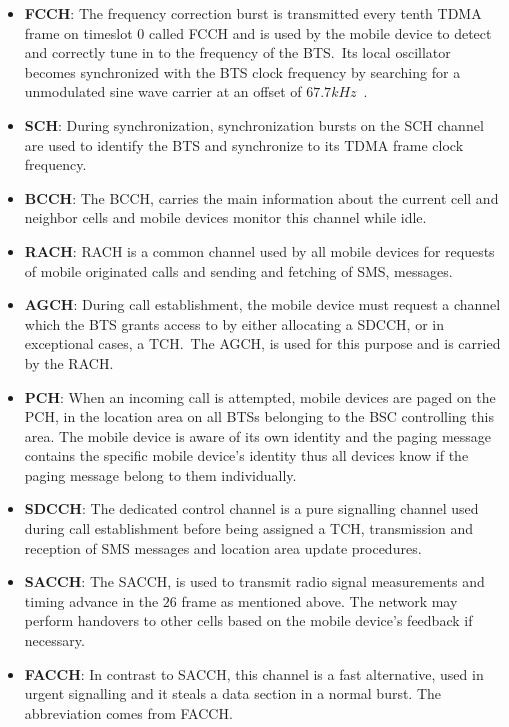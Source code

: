 \begin{itemize}
\item \textbf{FCCH}: The frequency correction burst is transmitted
  every tenth \gls{TDMA} frame on timeslot $0$ called \gls{FCCH} and
  is used by the mobile device to detect and correctly tune in to the
  frequency of the \gls{BTS}.\ Its local oscillator becomes
  synchronized with the \gls{BTS} clock frequency by searching for a
  unmodulated sine wave carrier at an offset of
  $67.7\si{kHz}$~\cite{bursts}.

\item \textbf{SCH}: During synchronization, synchronization bursts on
  the \gls{SCH} channel are used to identify the \gls{BTS} and
  synchronize to its \gls{TDMA} frame clock frequency.

\item \textbf{BCCH}: The \gls{BCCH}, carries the main information
  about the current cell and neighbor cells and mobile devices monitor
  this channel while idle.

\item \textbf{RACH}: \Gls{RACH} is a common
  channel used by all mobile devices for requests of mobile originated
  calls and sending and fetching of \gls{SMS}, messages.

\item \textbf{AGCH}: During call establishment, the mobile device must
  request a channel which the \gls{BTS} grants access to by either
  allocating a \gls{SDCCH}, or in exceptional cases, a \gls{TCH}.\ The
  \gls{AGCH}, is used for this purpose and is carried by the \gls{RACH}.\

\item \textbf{PCH}: When an incoming call is attempted, mobile devices
  are paged on the \gls{PCH}, in the location area on all \glspl{BTS}
  belonging to the \gls{BSC} controlling this area. The mobile device
  is aware of its own identity and the paging message contains the
  specific mobile device's identity thus all devices know if the
  paging message belong to them individually.

\item \textbf{SDCCH}: The dedicated control channel is a pure
  signalling channel used during call establishment before being
  assigned a \gls{TCH}, transmission and reception of \gls{SMS}
  messages and location area update procedures.

\item \textbf{SACCH}: The \gls{SACCH}, is used to transmit radio
  signal measurements and timing advance in the $26$ frame as
  mentioned above. The network may perform handovers to other cells
  based on the mobile device's feedback if necessary.

\item \textbf{FACCH}: In contrast to \gls{SACCH}, this channel is a
  fast alternative, used in urgent signalling and it steals a data
  section in a normal burst. The abbreviation comes from \gls{FACCH}.
\end{itemize}

